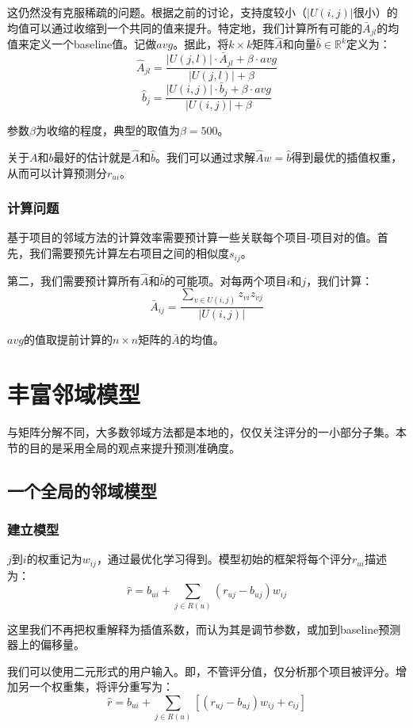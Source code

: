 \documentclass{article}
\begin{document}
 这仍然没有克服稀疏的问题。根据之前的讨论，支持度较小（$|U(i,j)|$很小）的均值可以通过收缩到一个共同的值来提升。特定地，我们计算所有可能的$\bar{A}_{jl}$的均值来定义一个baseline值。记做$avg$。据此，将$k\times k$矩阵$\hat{A}$和向量$\hat{b}\in\mathbb{R}^k$定义为：
 $$ \hat{A}_{jl}=\frac{|U(j,l)|\cdot\bar{A}_{jl}+\beta\cdot avg}{|U(j,l)|+\beta} $$
 $$ \hat{b}_{j}=\frac{|U(i,j)|\cdot\bar{b}_{j}+\beta\cdot avg}{|U(i,j)|+\beta} $$

 参数$\beta$为收缩的程度，典型的取值为$\beta=500$。

 关于$A$和$b$最好的估计就是$\hat{A}$和$\hat{b}$。我们可以通过求解$\hat{A}w=\hat{b}$得到最优的插值权重，从而可以计算预测分$r_{ui}$。

 \subsubsection{计算问题}
 基于项目的邻域方法的计算效率需要预计算一些关联每个项目-项目对的值。首先，我们需要预先计算左右项目之间的相似度$s_{ij}$。

 第二，我们需要预计算所有$\hat{A}$和$\hat{b}$的可能项。对每两个项目$i$和$j$，我们计算：
 $$ \bar{A}_{ij}=\frac{\sum_{v\in U(i,j)}z_{vi}z_{vj}}{|U(i,j)|} $$

 $avg$的值取提前计算的$n\times n$矩阵的$\bar{A}$的均值。

\section{丰富邻域模型}
与矩阵分解不同，大多数邻域方法都是本地的，仅仅关注评分的一小部分子集。本节的目的是采用全局的观点来提升预测准确度。

\subsection{一个全局的邻域模型}
\subsubsection{建立模型}
$j$到$i$的权重记为$w_{ij}$，通过最优化学习得到。模型初始的框架将每个评分$r_{ui}$描述为：
$$ \hat{r}=b_{ui}+\mathop{\sum}\limits_{j\in R(u)}(r_{uj}-b_{uj})w_{ij} $$

这里我们不再把权重解释为插值系数，而认为其是调节参数，或加到baseline预测器上的偏移量。

我们可以使用二元形式的用户输入。即，不管评分值，仅分析那个项目被评分。增加另一个权重集，将评分重写为：
$$ \hat{r}=b_{ui}+\mathop{\sum}\limits_{j\in R(u)}[(r_{uj}-b_{uj})w_{ij}+c_{ij}] $$
\end{document}
